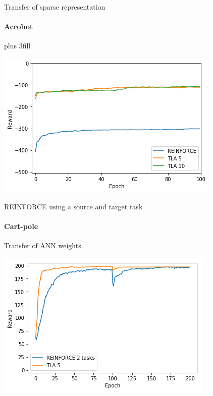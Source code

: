 \begin{frame}[fragile]{Transfer of sparse representation}
\framesubtitle{Acrobot}
\vskip0pt plus 3fill
\begin{center}
    \includegraphics[width=.8\linewidth]{results/Acrobot/sparse_transfer/reward_target_re-akt5-akt10.png}
\end{center}
\end{frame}

\begin{frame}[fragile]{REINFORCE using a source and target task}
\framesubtitle{Cart-pole}
Transfer of ANN weights.
\begin{center}
    \includegraphics[width=.8\linewidth]{results/CartPole/reinforce_2tasks.png}
\end{center}
\end{frame}

